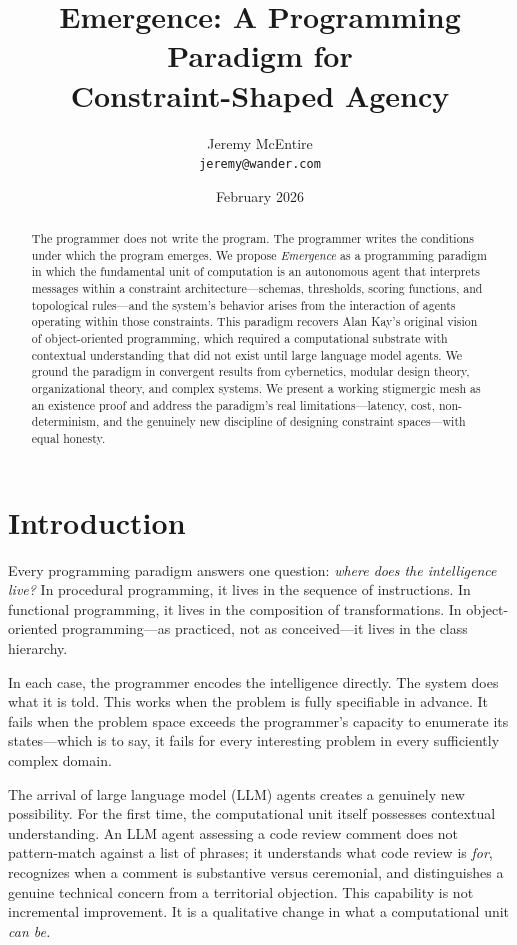 \documentclass[11pt,twocolumn]{article}
\title{\textbf{Emergence: A Programming Paradigm for\\Constraint-Shaped Agency}}
\author{
  Jeremy McEntire\\
  \texttt{jeremy@wander.com}
}
\date{February 2026}
\begin{document}
\maketitle

\begin{abstract}
The programmer does not write the program.  The programmer writes the
conditions under which the program emerges.  We propose \emph{Emergence}
as a programming paradigm in which the fundamental unit of computation
is an autonomous agent that interprets messages within a constraint
architecture---schemas, thresholds, scoring functions, and topological
rules---and the system's behavior arises from the interaction of agents
operating within those constraints.  This paradigm recovers Alan Kay's
original vision of object-oriented programming, which required a
computational substrate with contextual understanding that did not exist
until large language model agents.  We ground the paradigm in convergent
results from cybernetics, modular design theory, organizational theory,
and complex systems.  We present a working stigmergic mesh as an
existence proof and address the paradigm's real limitations---latency,
cost, non-determinism, and the genuinely new discipline of designing
constraint spaces---with equal honesty.
\end{abstract}

\section{Introduction}
\label{sec:intro}

Every programming paradigm answers one question: \emph{where does the
intelligence live?}  In procedural programming, it lives in the sequence
of instructions.  In functional programming, it lives in the composition
of transformations.  In object-oriented programming---as practiced, not
as conceived---it lives in the class hierarchy.

In each case, the programmer encodes the intelligence directly.  The
system does what it is told.  This works when the problem is fully
specifiable in advance.  It fails when the problem space exceeds the
programmer's capacity to enumerate its states---which is to say, it
fails for every interesting problem in every sufficiently complex
domain.

The arrival of large language model (LLM) agents creates a genuinely
new possibility.  For the first time, the computational unit itself
possesses contextual understanding.  An LLM agent assessing a code
review comment does not pattern-match against a list of phrases; it
understands what code review is \emph{for}, recognizes when a comment is
substantive versus ceremonial, and distinguishes a genuine technical
concern from a territorial objection.  This capability is not
incremental improvement.  It is a qualitative change in what a
computational unit \emph{can be.}
\end{document}
